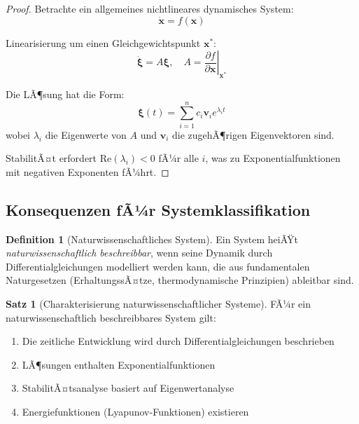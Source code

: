 ﻿\documentclass[a4paper,12pt]{report}
\theoremstyle{definition}
\newtheorem{definition}{Definition}[section]
\newtheorem{satz}{Satz}[section]
\begin{document}
\begin{proof}
	Betrachte ein allgemeines nichtlineares dynamisches System:
	\begin{equation}
		\dot{\mathbf{x}} = f(\mathbf{x})
	\end{equation}
	
	Linearisierung um einen Gleichgewichtspunkt $\mathbf{x}^*$:
	\begin{equation}
		\dot{\mathbf{\xi}} = A \mathbf{\xi}, \quad A = \left. \frac{\partial f}{\partial \mathbf{x}} \right|_{\mathbf{x}^*}
	\end{equation}
	
	Die LÃ¶sung hat die Form:
	\begin{equation}
		\mathbf{\xi}(t) = \sum_{i=1}^{n} c_i \mathbf{v}_i e^{\lambda_i t}
	\end{equation}
	wobei $\lambda_i$ die Eigenwerte von $A$ und $\mathbf{v}_i$ die zugehÃ¶rigen Eigenvektoren sind.
	
	StabilitÃ¤t erfordert $\text{Re}(\lambda_i) < 0$ fÃ¼r alle $i$, was zu Exponentialfunktionen mit negativen Exponenten fÃ¼hrt.
\end{proof}

\subsection{Konsequenzen fÃ¼r Systemklassifikation}

\begin{definition}[Naturwissenschaftliches System]
	Ein System heiÃŸt \textit{naturwissenschaftlich beschreibbar}, wenn seine Dynamik durch Differentialgleichungen modelliert werden kann, die aus fundamentalen Naturgesetzen (ErhaltungssÃ¤tze, thermodynamische Prinzipien) ableitbar sind.
\end{definition}

\begin{satz}[Charakterisierung naturwissenschaftlicher Systeme]
	FÃ¼r ein naturwissenschaftlich beschreibbares System gilt:
	\begin{enumerate}
		\item[-] Die zeitliche Entwicklung wird durch Differentialgleichungen beschrieben
		\item[-] LÃ¶sungen enthalten Exponentialfunktionen
		\item[-] StabilitÃ¤tsanalyse basiert auf Eigenwertanalyse
		\item[-] Energiefunktionen (Lyapunov-Funktionen) existieren
	\end{enumerate}
\end{satz}
\end{document}
